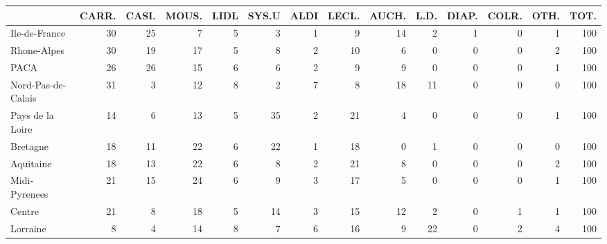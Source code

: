 \documentclass[11pt]{article}
\begin{document}
\begin{table}[H]
\begin{tabular}{lrrrrrrrrrrrrr}
\toprule
{} &      CARR. &      CASI. &      MOUS. &       LIDL &      SYS.U &       ALDI &      LECL. &      AUCH. &       L.D. &      DIAP. &      COLR. &       OTH. &       TOT. \\
\midrule
Ile-de-France        &         30 &         25 &          7 &          5 &          3 &          1 &          9 &         14 &          2 &          1 &          0 &          1 &        100 \\
Rhone-Alpes          &         30 &         19 &         17 &          5 &          8 &          2 &         10 &          6 &          0 &          0 &          0 &          2 &        100 \\
PACA                 &         26 &         26 &         15 &          6 &          6 &          2 &          9 &          9 &          0 &          0 &          0 &          1 &        100 \\
Nord-Pas-de-Calais   &         31 &          3 &         12 &          8 &          2 &          7 &          8 &         18 &         11 &          0 &          0 &          0 &        100 \\
Pays de la Loire     &         14 &          6 &         13 &          5 &         35 &          2 &         21 &          4 &          0 &          0 &          0 &          1 &        100 \\
Bretagne             &         18 &         11 &         22 &          6 &         22 &          1 &         18 &          0 &          1 &          0 &          0 &          0 &        100 \\
Aquitaine            &         18 &         13 &         22 &          6 &          8 &          2 &         21 &          8 &          0 &          0 &          0 &          2 &        100 \\
Midi-Pyrenees        &         21 &         15 &         24 &          6 &          9 &          3 &         17 &          5 &          0 &          0 &          0 &          1 &        100 \\
Centre               &         21 &          8 &         18 &          5 &         14 &          3 &         15 &         12 &          2 &          0 &          1 &          1 &        100 \\
Lorraine             &          8 &          4 &         14 &          8 &          7 &          6 &         16 &          9 &         22 &          0 &          2 &          4 &        100 \\

\end{tabular}
\end{table}
\end{document}
